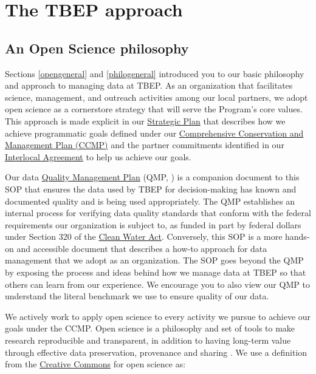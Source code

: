 \documentclass[
]{book}
\begin{document}
\section{The TBEP approach}\label{tbepapproach}

\subsection{An Open Science philosophy}\label{philo}

Sections \ref{opengeneral} and \ref{philogeneral} introduced you to our basic philosophy and approach to managing data at TBEP. As an organization that facilitates science, management, and outreach activities among our local partners, we adopt open science as a cornerstore strategy that will serve the Program's core values. This approach is made explicit in our \href{https://drive.google.com/file/d/11xohuoaHDxNHRqgXoOHdI37FpWvac_rn/view?usp=sharing}{Strategic Plan} that describes how we achieve programmatic goals defined under our \href{https://ccmp.tbep.org}{Comprehensive Conservation and Management Plan (CCMP)} and the partner commitments identified in our \href{https://drive.google.com/file/d/1iJcWxmc5SeyDTqiCQ3MLQGWEY_EDGtZT/view?usp=sharing}{Interlocal Agreement} to help us achieve our goals.

Our data \href{https://drive.google.com/file/d/1DyA0PNHV8rEXGMwGiyS7sXY1ECLYpJJO/view}{Quality Management Plan} (QMP, \citet{tbep1620}) is a companion document to this SOP that ensures the data used by TBEP for decision-making has known and documented quality and is being used appropriately. The QMP establishes an internal process for verifying data quality standards that conform with the federal requirements our organization is subject to, as funded in part by federal dollars under Section 320 of the \href{https://www.epa.gov/laws-regulations/summary-clean-water-act}{Clean Water Act}. Conversely, this SOP is a more hands-on and accessible document that describes a how-to approach for data management that we adopt as an organization. The SOP goes beyond the QMP by exposing the process and ideas behind how we manage data at TBEP so that others can learn from our experience. We encourage you to also view our QMP to understand the literal benchmark we use to ensure quality of our data.

We actively work to apply open science to every activity we pursue to achieve our goals under the CCMP. Open science is a philosophy and set of tools to make research reproducible and transparent, in addition to having long-term value through effective data preservation, provenance and sharing \citep{Beck20}. We use a definition from the \href{https://creativecommons.org/about/program-areas/open-science/}{Creative Commons} for open science as:
\end{document}
